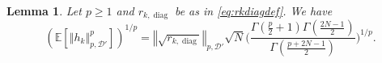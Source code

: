 \documentclass[12pt, a4paper]{amsart}
\newcommand{\tmop}[1]{\ensuremath{\operatorname{#1}}}
\newtheorem{lemma}[theorem]{Lemma}
\theoremstyle{definition}
\newcommand {\1} {\mathbf{1}}
\newcommand {\Dc} {\mathcal{D}}
\newcommand {\Kc} {\mathcal{K}}
\numberwithin{equation}{section}
\begin{document}
%
\begin{lemma}
\label{lem:LpAsymp}Let $p\ge1$ and $r_{k,\tmop{diag}}$ be as in \eqref{eq:rkdiagdef}. We have
\[
\left(\mathbb{E}\left[\left\Vert h_{k}\right\Vert _{p,\Dc'}^{p}\right]\right)^{1/p}=
 \left\Vert \sqrt{r_{k,\tmop{diag}}} \right\Vert_{p,\mathcal D'} \sqrt{N} \bigg(\frac{\Gamma\left(\frac{p}{2}+1\right)\Gamma\left(\frac{2N-1}{2}\right)}{\Gamma\left(\frac{p+2N-1}{2}\right)} \bigg)^{1/p}.
\]

\end{lemma}
\end{document}

